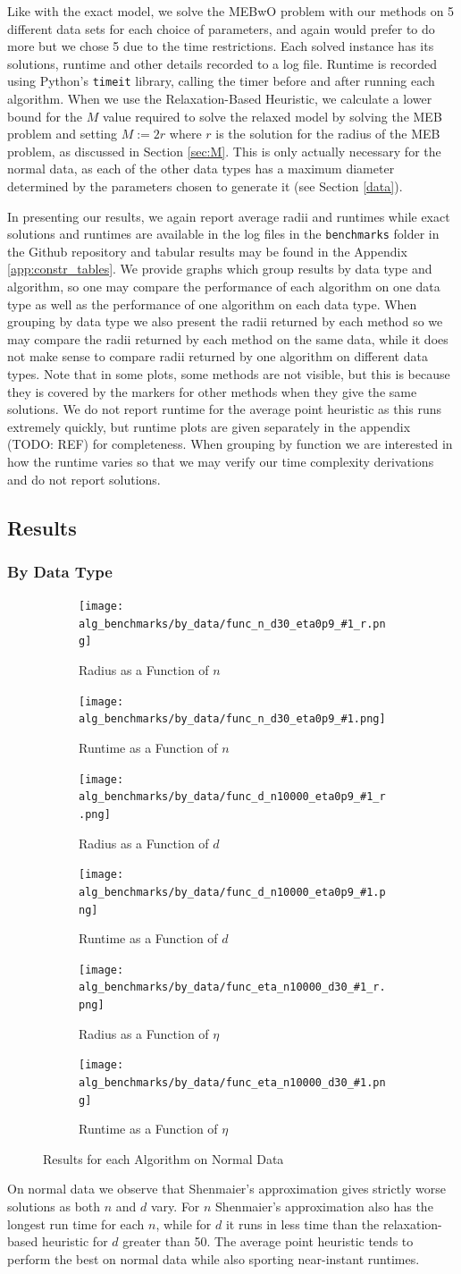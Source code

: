 \documentclass[11pt,twoside]{report}
\newcommand{\benchmarkfiguresix}[2]{
    \begin{figure}[ht]
        \centering
        \begin{subfigure}[b]{0.475\textwidth}
            \centering
            \texttt{[image: alg\_benchmarks/by\_data/func\_n\_d30\_eta0p9\_\#1\_r.png]}
            \caption{Radius as a Function of $n$}
            \label{fig:constr_r_#1_n}
        \end{subfigure}
        \hfill
        \begin{subfigure}[b]{0.475\textwidth}
            \centering
            \texttt{[image: alg\_benchmarks/by\_data/func\_n\_d30\_eta0p9\_\#1.png]}
            \caption{Runtime as a Function of $n$}
            \label{fig:constr_runtime_#1_n}
        \end{subfigure}
        
        \begin{subfigure}[b]{0.475\textwidth}
            \centering
            \texttt{[image: alg\_benchmarks/by\_data/func\_d\_n10000\_eta0p9\_\#1\_r.png]}
            \caption{Radius as a Function of $d$}
            \label{fig:constr_r_#1_d}
        \end{subfigure}
        \hfill
        \begin{subfigure}[b]{0.475\textwidth}
            \centering
            \texttt{[image: alg\_benchmarks/by\_data/func\_d\_n10000\_eta0p9\_\#1.png]}
            \caption{Runtime as a Function of $d$}
            \label{fig:constr_runtime_#1_d}
        \end{subfigure}
        
        \begin{subfigure}[b]{0.475\textwidth}
            \centering
            \texttt{[image: alg\_benchmarks/by\_data/func\_eta\_n10000\_d30\_\#1\_r.png]}
            \caption{Radius as a Function of $\eta$}
            \label{fig:constr_r_#1_eta}
        \end{subfigure}
        \hfill
        \begin{subfigure}[b]{0.475\textwidth}
            \centering
            \texttt{[image: alg\_benchmarks/by\_data/func\_eta\_n10000\_d30\_\#1.png]}
            \caption{Runtime as a Function of $\eta$}
            \label{fig:constr_runtime_#1_eta}
        \end{subfigure}
        \caption{Results for each Algorithm on #2 Data}
        \label{fig:constr_#1}
    \end{figure}
}
\theoremstyle{definition}
\numberwithin{theorem}{section}
\numberwithin{definition}{section}
\numberwithin{lemma}{section}
\numberwithin{proposition}{section}
\numberwithin{equation}{section}
\numberwithin{figure}{section}
\begin{document}
Like with the exact model, we solve the MEBwO problem with our methods on 5 different data sets for each choice of parameters, and again would prefer to do more but we chose 5 due to the time restrictions. Each solved instance has its solutions, runtime and other details recorded to a log file. Runtime is recorded using Python's \texttt{timeit} library, calling the timer before and after running each algorithm. When we use the Relaxation-Based Heuristic, we calculate a lower bound for the $M$ value required to solve the relaxed model by solving the MEB problem and setting $M:=2r$ where $r$ is the solution for the radius of the MEB problem, as discussed in Section \ref{sec:M}. This is only actually necessary for the normal data, as each of the other data types has a maximum diameter determined by the parameters chosen to generate it (see Section \ref{data}).

In presenting our results, we again report average radii and runtimes while exact solutions and runtimes are available in the log files in the \texttt{benchmarks} folder in the Github repository and tabular results may be found in the Appendix \ref{app:constr_tables}. We provide graphs which group results by data type and algorithm, so one may compare the performance of each algorithm on one data type as well as the performance of one algorithm on each data type. When grouping by data type we also present the radii returned by each method so we may compare the radii returned by each method on the same data, while it does not make sense to compare radii returned by one algorithm on different data types. Note that in some plots, some methods are not visible, but this is because they is covered by the markers for other methods when they give the same solutions. We do not report runtime for the average point heuristic as this runs extremely quickly, but runtime plots are given separately in the appendix (TODO: REF) for completeness. When grouping by function we are interested in how the runtime varies so that we may verify our time complexity derivations and do not report solutions.

\subsection{Results}
\subsubsection{By Data Type}

\benchmarkfiguresix{normal}{Normal}
On normal data we observe that Shenmaier's approximation gives strictly worse solutions as both $n$ and $d$ vary. For $n$ Shenmaier's approximation also has the longest run time for each $n$, while for $d$ it runs in less time than the relaxation-based heuristic for $d$ greater than 50. The average point heuristic tends to perform the best on normal data while also sporting near-instant runtimes.
\end{document}
